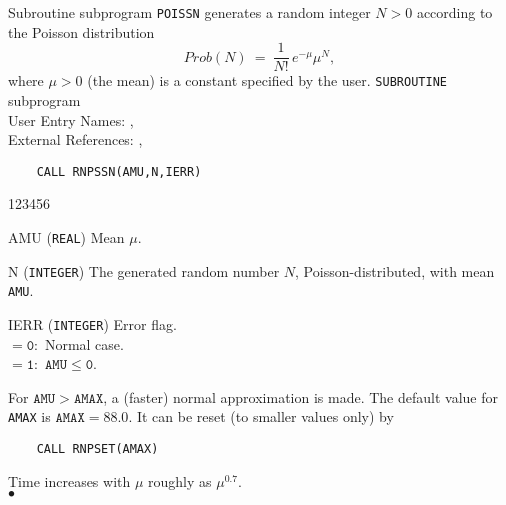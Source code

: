                                
                
\Submitter{}                                   
                             
Subroutine subprogram {\tt POISSN} generates a random integer
$N>0$ according to the Poisson distribution
$$ Prob(N) \ = \ \displaystyle \frac{1}{N!} \, e^{-\mu} \mu^N, $$
where $\mu > 0$ (the mean) is a constant specified by the user.
\Structure
{\tt SUBROUTINE} subprogram \\
User Entry Names: , \\
External References: , 
\Usage
\begin{verbatim}
    CALL RNPSSN(AMU,N,IERR)
\end{verbatim}
\begin{DLtt}{123456}
\item[AMU] ({\tt REAL}) Mean $\mu$.
\item[N] ({\tt INTEGER}) The generated random number $N$,
Poisson-distributed, with mean {\tt AMU}.
\item[IERR] ({\tt INTEGER}) Error flag. \\
$\mathtt{= 0:}$ Normal case.  \\
$\mathtt{= 1:}$ $\mathtt{AMU \le 0}$.
\end{DLtt}
For $\mathtt{AMU > AMAX}$, a (faster) normal approximation is made.
The default value for {\tt AMAX} is $\mathtt{AMAX=88.0}$.
It can be reset (to smaller values only) by
\begin{verbatim}
    CALL RNPSET(AMAX)
\end{verbatim}
\Timing
Time increases with $\mu$ roughly as $\mu^{0.7}$.
\\ $\bullet$
